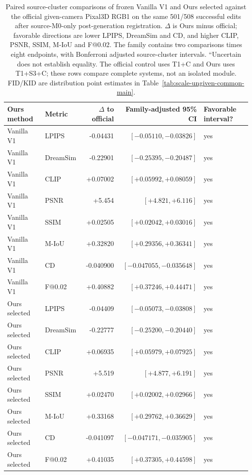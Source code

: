 \begin{table}[t]
\centering\scriptsize
\begin{tabular}{llrrl}
\toprule
Ours method & Metric & $\Delta$ to official & Family-adjusted 95\% CI & Favorable interval?\\
\midrule
Vanilla V1 & LPIPS & -0.04431 & $[-0.05110,-0.03826]$ & yes\\
Vanilla V1 & DreamSim & -0.22901 & $[-0.25395,-0.20487]$ & yes\\
Vanilla V1 & CLIP & +0.07002 & $[+0.05992,+0.08059]$ & yes\\
Vanilla V1 & PSNR & +5.454 & $[+4.821,+6.116]$ & yes\\
Vanilla V1 & SSIM & +0.02505 & $[+0.02042,+0.03016]$ & yes\\
Vanilla V1 & M-IoU & +0.32820 & $[+0.29356,+0.36341]$ & yes\\
Vanilla V1 & CD & -0.040900 & $[-0.047055,-0.035648]$ & yes\\
Vanilla V1 & F@0.02 & +0.40882 & $[+0.37246,+0.44471]$ & yes\\
\midrule
Ours selected & LPIPS & -0.04409 & $[-0.05073,-0.03808]$ & yes\\
Ours selected & DreamSim & -0.22777 & $[-0.25200,-0.20440]$ & yes\\
Ours selected & CLIP & +0.06935 & $[+0.05979,+0.07925]$ & yes\\
Ours selected & PSNR & +5.519 & $[+4.877,+6.191]$ & yes\\
Ours selected & SSIM & +0.02470 & $[+0.02002,+0.02966]$ & yes\\
Ours selected & M-IoU & +0.33168 & $[+0.29762,+0.36629]$ & yes\\
Ours selected & CD & -0.041097 & $[-0.047171,-0.035905]$ & yes\\
Ours selected & F@0.02 & +0.41035 & $[+0.37305,+0.44598]$ & yes\\
\bottomrule
\end{tabular}
\caption{Paired source-cluster comparisons of frozen Vanilla V1 and Ours selected against the official given-camera Pixal3D RGB1 on the same 501/508 successful edits after source-M0-only post-generation registration. $\Delta$ is Ours minus official; favorable directions are lower LPIPS, DreamSim and CD, and higher CLIP, PSNR, SSIM, M-IoU and F@0.02. The family contains two comparisons times eight endpoints, with Bonferroni adjusted source-cluster intervals. ``Uncertain does not establish equality. The official control uses T1+C and Ours uses T1+S3+C; these rows compare complete systems, not an isolated module. FID/KID are distribution point estimates in Table~\ref{tab:scale-ungiven-common-main}.}
\label{tab:scale-ungiven-official-contrasts}
\end{table}
